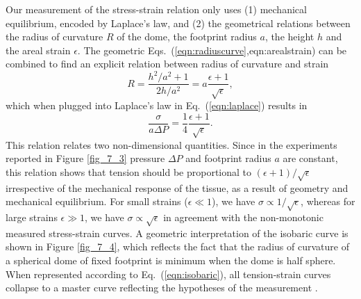 Our measurement of the stress-strain relation only uses (1) mechanical equilibrium, encoded by Laplace's law, and (2) the geometrical relations between the radius of curvature $R$ of the dome, the footprint radius $a$, the height $h$ and the areal strain $\epsilon$. The geometric Eqs.~(\ref{eqn:radiuscurve},{eqn:arealstrain}) can be combined to find an explicit relation between radius of curvature and strain
\begin{equation}
	R = \frac{h^2/a^2 + 1}{2h/a^2} = a\frac{\epsilon + 1}{\sqrt{\epsilon}},
\end{equation}
which when plugged into Laplace's law in Eq.~(\ref{eqn:laplace}) results in 
\begin{equation}
	\label{eqn:isobaric}
	\frac{\sigma}{a \Delta P} = \frac{1}{4}  \frac{\epsilon + 1}{\sqrt{\epsilon}}.
\end{equation}
This relation relates two non-dimensional quantities. Since in the experiments reported in Figure \ref{fig_7_3} pressure $\Delta P$ and footprint radius $a$ are constant, this relation shows that tension should be proportional to $(\epsilon + 1)/\sqrt{\epsilon}$ irrespective of the mechanical response of the tissue, as a result of geometry and mechanical equilibrium. For small strains ($\epsilon\ll 1$), we have $\sigma \propto 1/\sqrt{\epsilon}$, whereas for large strains $\epsilon\gg 1$, we have $\sigma \propto \sqrt{\epsilon}$ in agreement with the non-monotonic measured stress-strain curves. A geometric interpretation of the isobaric curve is shown in Figure \ref{fig_7_4}, which reflects the fact that the radius of curvature of a spherical dome of fixed footprint is minimum when the dome is half sphere. When represented according to Eq.~(\ref{eqn:isobaric}), all tension-strain curves collapse to a master curve reflecting the hypotheses of the measurement .





